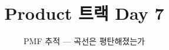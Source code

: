 \documentclass[aspectratio=169,11pt,t]{beamer}
\title{Product 트랙 Day 7}
\subtitle{PMF 추적 — 곡선은 평탄해졌는가}
\begin{document}
\begin{frame}[plain,c]
\titlepage
\end{frame}

\end{document}
